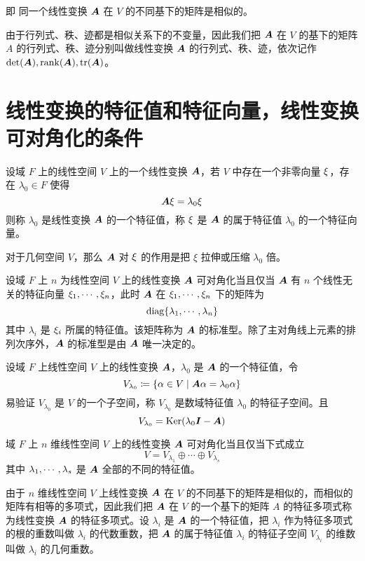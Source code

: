 即 同一个线性变换 $\boldsymbol{A}$ 在 $V$ 的不同基下的矩阵是相似的。

由于行列式、秩、迹都是相似关系下的不变量，因此我们把 $\boldsymbol{A}$ 在 $V$ 的基下的矩阵 $A$ 的行列式、秩、迹分别叫做线性变换 $\boldsymbol{A}$ 的行列式、秩、迹，依次记作 $\det(\boldsymbol{A}),\operatorname{rank}(\boldsymbol{A}),\operatorname{tr}(\boldsymbol{A})$。

\section{线性变换的特征值和特征向量，线性变换可对角化的条件}

\begin{definition}
    设域 $F$ 上的线性空间 $V$ 上的一个线性变换 $\boldsymbol{A}$，若 $V$ 中存在一个非零向量 $\xi$，存在 $\lambda_0 \in F$ 使得
    \[ \boldsymbol{A} \xi = \lambda_0\xi \]
    则称 $\lambda_0$ 是线性变换 $\boldsymbol{A}$ 的一个特征值，称 $\xi$ 是 $\boldsymbol{A}$ 的属于特征值 $\lambda_0$ 的一个特征向量。
\end{definition}

对于几何空间 $V$，那么 $\boldsymbol{A}$ 对 $\xi$ 的作用是把 $\xi$ 拉伸或压缩 $\lambda_0$ 倍。

\begin{theorem}
    设域 $F$ 上 $n$ 为线性空间 $V$ 上的线性变换 $\boldsymbol{A}$ 可对角化当且仅当 $\boldsymbol{A}$ 有 $n$ 个线性无关的特征向量 $\xi_1,\cdots,\xi_n$，此时 $\boldsymbol{A}$ 在 $\xi_1,\cdots,\xi_n$ 下的矩阵为
    \[ \operatorname{diag}\{\lambda_1,\cdots,\lambda_n\} \]
    其中 $\lambda_i$ 是 $\xi_i$ 所属的特征值。该矩阵称为 $\boldsymbol{A}$ 的标准型。除了主对角线上元素的排列次序外，$\boldsymbol{A}$ 的标准型是由 $\boldsymbol{A}$ 唯一决定的。
\end{theorem}

设域 $F$ 上线性空间 $V$ 上的线性变换 $\boldsymbol{A}$，$\lambda_0$ 是 $\boldsymbol{A}$ 的一个特征值，令
\[ V_{\lambda_0} \coloneqq \{ \alpha \in V \mid \boldsymbol{A}\alpha = \lambda_0\alpha \} \]
易验证 $V_{\lambda_0}$ 是 $V$ 的一个子空间，称 $V_{\lambda_0}$ 是数域特征值 $\lambda_0$ 的特征子空间。且
\[ V_{\lambda_0} = \operatorname{Ker}(\lambda_0\boldsymbol{I} - \boldsymbol{A}) \]

\begin{proposition}
    域 $F$ 上 $n$ 维线性空间 $V$ 上的线性变换 $\boldsymbol{A}$ 可对角化当且仅当下式成立
    \[ V = V_{\lambda_1} \oplus \cdots \oplus V_{\lambda_s} \]
    其中 $\lambda_1,\cdots,\lambda_s$ 是 $\boldsymbol{A}$ 全部的不同的特征值。
\end{proposition}

由于 $n$ 维线性空间 $V$ 上线性变换 $\boldsymbol{A}$ 在 $V$ 的不同基下的矩阵是相似的，而相似的矩阵有相等的多项式，因此我们把 $\boldsymbol{A}$ 在 $V$ 的一个基下的矩阵 $A$ 的特征多项式称为线性变换 $\boldsymbol{A}$ 的特征多项式。设 $\lambda_i$ 是 $\boldsymbol{A}$ 的一个特征值，把 $\lambda_i$ 作为特征多项式的根的重数叫做 $\lambda_i$ 的代数重数，把 $\boldsymbol{A}$ 的属于特征值 $\lambda_i$ 的特征子空间 $V_{\lambda_i}$ 的维数叫做 $\lambda_i$ 的几何重数。 

